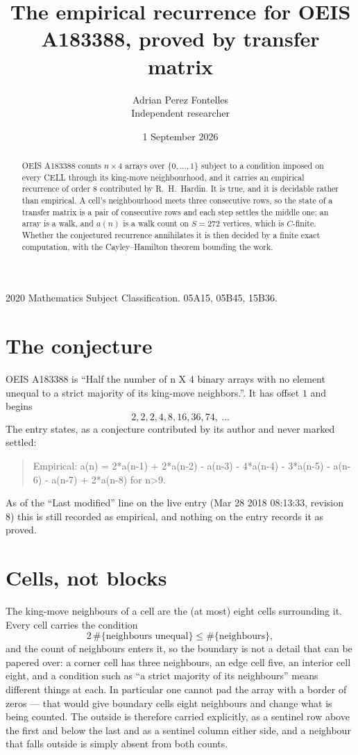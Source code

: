 \documentclass[11pt,a4paper]{article}
\title{The empirical recurrence for OEIS A183388, proved by transfer matrix}
\author{Adrian Perez Fontelles\\ \small Independent researcher}
\date{1 September 2026}
\theoremstyle{plain}
\theoremstyle{definition}
\begin{document}
\maketitle

\begin{abstract}
OEIS A183388 counts $n\times4$ arrays over $\{0,\dots,1\}$ subject to a condition imposed on
every CELL through its king-move neighbourhood, and it carries an empirical recurrence of
order $8$ contributed by R.~H.~Hardin. It is true, and it is decidable rather than
empirical. A cell's neighbourhood meets three consecutive rows, so the state of a transfer
matrix is a pair of consecutive rows and each step settles the middle one; an array is a
walk, and $a(n)$ is a walk count on $S=272$ vertices, which is $C$-finite. Whether the
conjectured recurrence annihilates it is then decided by a finite exact computation, with the
Cayley--Hamilton theorem bounding the work.
\end{abstract}

\noindent\small 2020 Mathematics Subject Classification. 05A15, 05B45, 15B36.\normalsize

\section{The conjecture}

OEIS A183388 is ``Half the number of n X 4 binary arrays with no element unequal to a strict majority of its king-move neighbors.''. It has offset $1$ and begins
\[
2, 2, 2, 4, 8, 16, 36, 74,\ \dots
\]
The entry states, as a conjecture contributed by its author and never marked settled:
\begin{quote}
Empirical: a(n) = 2*a(n-1) + 2*a(n-2) - a(n-3) - 4*a(n-4) - 3*a(n-5) - a(n-6) - a(n-7) + 2*a(n-8) for n>9.
\end{quote}
As of the ``Last modified'' line on the live entry (Mar 28 2018 08:13:33, revision 8) this is still
recorded as empirical, and nothing on the entry records it as proved.

\section{Cells, not blocks}

The king-move neighbours of a cell are the (at most) eight cells surrounding it. Every cell
carries the condition
\[
2\,\#\{\text{neighbours unequal}\}\le\#\{\text{neighbours}\},
\]
and the count of neighbours enters it, so the boundary is not a detail that can be papered
over: a corner cell has three neighbours, an edge cell five, an interior cell eight, and a
condition such as ``a strict majority of its neighbours'' means different things at each. In
particular one cannot pad the array with a border of zeros --- that would give boundary cells
eight neighbours and change what is being counted. The outside is therefore carried
explicitly, as a sentinel row above the first and below the last and as a sentinel column
either side, and a neighbour that falls outside is simply absent from both counts.
\end{document}
